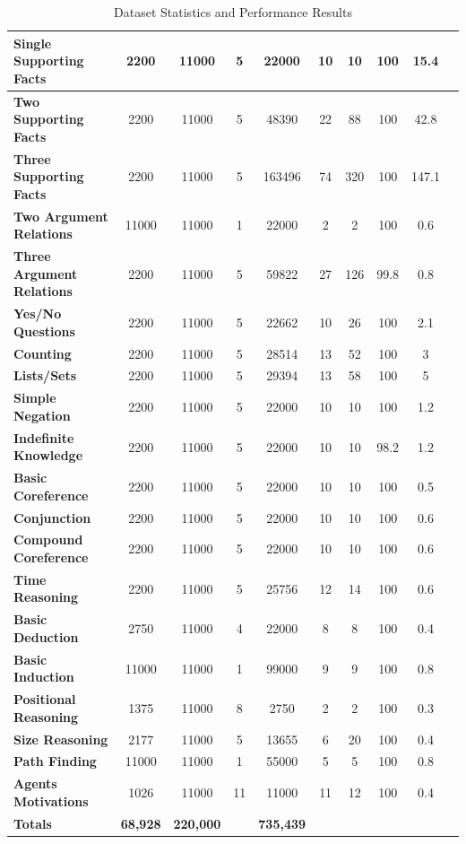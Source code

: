 \documentclass[letterpaper]{article}
\begin{document}
\begin{table}[b]
\begin{tabular}{|l||*{9}{c|}}
\textbf{\cellcolor{green!20}Single Supporting Facts} & 2200 & 11000 & 5 & 22000 & 10 & 10 & 100 & 15.4  \\\hline
\textbf{\cellcolor{green!20}Two Supporting Facts} & 2200 & 11000 &  5 & 48390 & 22 & 88 & 100 & 42.8\\\hline
\textbf{\cellcolor{green!20}Three Supporting Facts} & 2200 & 11000 & 5 & 163496 & 74 & 320 & 100 & 147.1\\\hline
\textbf{\cellcolor{green!20}Two Argument Relations} & 11000 & 11000  & 1 & 22000 & 2 & 2 & 100 & 0.6\\\hline
\textbf{\cellcolor{green!20}Three Argument Relations} & 2200 & 11000 & 5 & 59822 & 27 & 126 & 99.8 & 0.8\\\hline
\textbf{\cellcolor{green!20}Yes/No Questions} & 2200 & 11000 & 5 & 22662 & 10 & 26 & 100 & 2.1\\\hline
\textbf{\cellcolor{green!20}Counting} & 2200 & 11000 & 5 & 28514 & 13 & 52 & 100 & 3\\\hline
\textbf{\cellcolor{green!20}Lists/Sets} & 2200 & 11000 & 5 & 29394 & 13 & 58 & 100 & 5\\\hline
\textbf{\cellcolor{green!20}Simple Negation}  & 2200 & 11000 & 5 & 22000 & 10 & 10 & 100 & 1.2\\\hline
\textbf{\cellcolor{green!20}Indefinite Knowledge} & 2200 & 11000 & 5 & 22000  & 10 & 10 & 98.2 & 1.2\\\hline
\textbf{\cellcolor{green!20}Basic Coreference} & 2200 & 11000 & 5 & 22000 & 10 & 10  & 100 & 0.5\\\hline
\textbf{\cellcolor{green!20}Conjunction} & 2200 & 11000  & 5 & 22000 & 10 & 10 & 100 & 0.6\\\hline
\textbf{\cellcolor{green!20}Compound Coreference} & 2200 & 11000 & 5 & 22000 & 10 & 10 & 100 & 0.6\\\hline
\textbf{\cellcolor{green!20}Time Reasoning} & 2200 & 11000  & 5 & 25756 & 12 & 14 & 100 & 0.6\\\hline
\textbf{\cellcolor{green!20}Basic Deduction} & 2750 & 11000 & 4 & 22000 & 8 & 8 & 100 & 0.4\\\hline
\textbf{\cellcolor{green!20}Basic Induction} & 11000 & 11000 & 1 & 99000 & 9 & 9 & 100 & 0.8\\\hline
\textbf{\cellcolor{green!20}Positional Reasoning} & 1375 & 11000 & 8 & 2750 & 2 & 2 & 100 & 0.3\\\hline
\textbf{\cellcolor{green!20}Size Reasoning} & 2177 & 11000 & 5 & 13655 & 6 & 20 & 100 & 0.4\\\hline
\textbf{\cellcolor{green!20}Path Finding} & 11000 & 11000 & 1 & 55000 & 5 & 5 & 100 & 0.8\\\hline
\textbf{\cellcolor{green!20}Agents Motivations} & 1026 & 11000 & 11 & 11000 & 11 & 12 & 100 & 0.4\\\hline
\textbf{\cellcolor{orange!20}\textbf{Totals}} & \textbf{68,928} & \textbf{220,000} &  & \textbf{735,439} &  &  &  & \\\hline
\end{tabular}
\caption{Dataset Statistics and Performance Results}
\label{table:square_performance_result}
\end{table}
\end{document}
